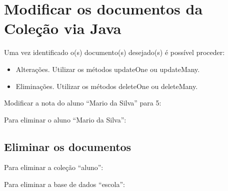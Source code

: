 \section{Modificar os documentos da Coleção via Java}
Uma vez identificado o(s) documento(s) desejado(s) é possível proceder:
\begin{itemize}[nolistsep]
	\item Alterações. Utilizar os métodos updateOne ou updateMany.
	\item Eliminações. Utilizar os métodos deleteOne ou deleteMany.
\end{itemize}

Modificar a nota do aluno ``Mario da Silva'' para 5: \\

Para eliminar o aluno ``Mario da Silva'': \\

\subsection{Eliminar os documentos}
Para eliminar a coleção ``aluno'': \\

Para eliminar a base de dados ``escola'': \\

